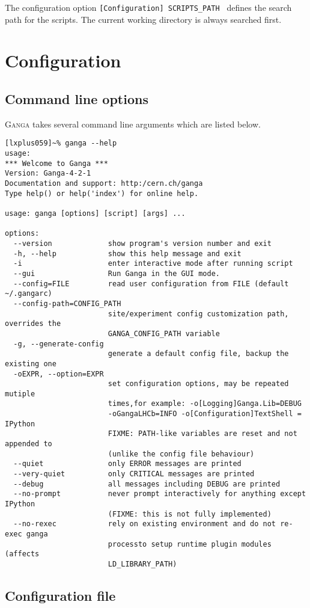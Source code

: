 \documentclass{howto}
\def\ganga {\textsc{Ganga}\xspace}
\begin{document}
The configuration  option {\tt [Configuration]  SCRIPTS_PATH } defines
the  search path  for the  scripts. The  current working  directory is
always searched first.

\section{Configuration}
\subsection{Command line options}
\ganga takes several command line arguments which are listed below.
\begin{verbatim}
[lxplus059]~% ganga --help
usage: 
*** Welcome to Ganga ***
Version: Ganga-4-2-1
Documentation and support: http:/cern.ch/ganga
Type help() or help('index') for online help.

usage: ganga [options] [script] [args] ...

options:
  --version             show program's version number and exit
  -h, --help            show this help message and exit
  -i                    enter interactive mode after running script
  --gui                 Run Ganga in the GUI mode.
  --config=FILE         read user configuration from FILE (default ~/.gangarc)
  --config-path=CONFIG_PATH
                        site/experiment config customization path, overrides the
                        GANGA_CONFIG_PATH variable
  -g, --generate-config
                        generate a default config file, backup the existing one
  -oEXPR, --option=EXPR
                        set configuration options, may be repeated mutiple
                        times,for example: -o[Logging]Ganga.Lib=DEBUG
                        -oGangaLHCb=INFO -o[Configuration]TextShell = IPython
                        FIXME: PATH-like variables are reset and not appended to
                        (unlike the config file behaviour)
  --quiet               only ERROR messages are printed
  --very-quiet          only CRITICAL messages are printed
  --debug               all messages including DEBUG are printed
  --no-prompt           never prompt interactively for anything except IPython
                        (FIXME: this is not fully implemented)
  --no-rexec            rely on existing environment and do not re-exec ganga
                        processto setup runtime plugin modules (affects
                        LD_LIBRARY_PATH)
\end{verbatim}

\subsection{Configuration file}
\end{document}
